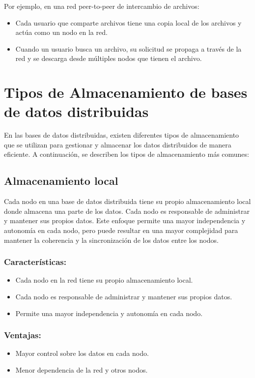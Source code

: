 Por ejemplo, en una red peer-to-peer de intercambio de archivos:

\begin{itemize}
	\item Cada usuario que comparte archivos tiene una copia local de los archivos y actúa como un nodo en la red.
	\item Cuando un usuario busca un archivo, su solicitud se propaga a través de la red y se descarga desde múltiples nodos que tienen el archivo.
\end{itemize}

\section{Tipos de Almacenamiento de bases de datos distribuidas}
\noindent
En las bases de datos distribuidas, existen diferentes tipos de almacenamiento que se utilizan para gestionar y almacenar los datos distribuidos de manera eficiente. A continuación, se describen los tipos de almacenamiento más comunes:

\subsection{Almacenamiento local}
\noindent
Cada nodo en una base de datos distribuida tiene su propio almacenamiento local donde almacena una parte de los datos. Cada nodo es responsable de administrar y mantener sus propios datos. Este enfoque permite una mayor independencia y autonomía en cada nodo, pero puede resultar en una mayor complejidad para mantener la coherencia y la sincronización de los datos entre los nodos.

\subsubsection{Características:}
\noindent
\begin{itemize}
	\item Cada nodo en la red tiene su propio almacenamiento local.
	\item Cada nodo es responsable de administrar y mantener sus propios datos.
	\item Permite una mayor independencia y autonomía en cada nodo.
\end{itemize}

\subsubsection{Ventajas:}
\noindent
\begin{itemize}
	\item Mayor control sobre los datos en cada nodo.
	\item Menor dependencia de la red y otros nodos.
\end{itemize}

